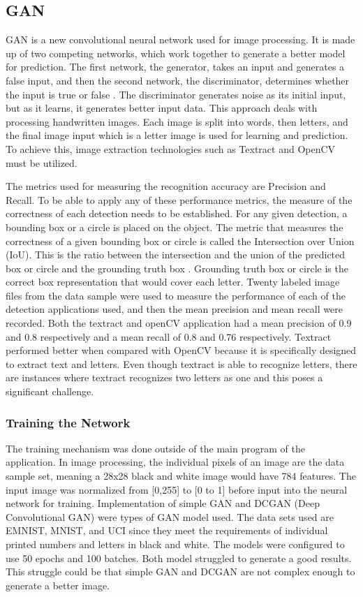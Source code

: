 \documentclass{article}
\begin{document}
\subsection{GAN}
GAN is a new convolutional neural network used for image processing. It is made up of two competing networks, which work together to generate a better model for prediction. The first network, the generator, takes an input and generates a false input, and then the second network, the discriminator, determines whether the input is true or false \cite{Dysgraphia_GAN}. The discriminator generates noise as its initial input, but as it learns, it generates better input data. This approach deals with processing handwritten images. Each image is split into words, then letters, and the final image input which is a letter image is used for learning and prediction. To achieve this, image extraction technologies such as Textract and OpenCV must be utilized. 

The metrics used for measuring the recognition accuracy are Precision and Recall. To be able to apply any of these performance metrics, the measure of the correctness of each detection needs to be established. For any given detection, a bounding box or a circle is placed on the object. The metric that measures the correctness of a given bounding box or circle is called the Intersection over Union (IoU). This is the ratio between the intersection and the union of the predicted box or circle and the grounding truth box \cite{Dysgraphia_IoU_evaluation}. Grounding truth box or circle is the correct box representation that would cover each letter. Twenty labeled image files from the data sample were used to measure the performance of each of the detection applications used, and then the mean precision and mean recall were recorded. Both the textract and openCV application had a mean precision of 0.9 and 0.8 respectively and a mean recall of 0.8 and 0.76 respectively. Textract performed better when compared with OpenCV because it is specifically designed to extract text and letters. Even though textract is able to recognize letters, there are instances where textract recognizes two letters as one and this poses a significant challenge.

\subsubsection{Training the Network}
The training mechanism was done outside of the main program of the application. In image processing, the individual pixels of an image are the data sample set, meaning a 28x28 black and white image would have 784 features. The input image was normalized from [0,255] to [0 to 1] before input into the neural network for training. Implementation of simple GAN and DCGAN (Deep Convolutional GAN) were types of GAN model used. The data sets used are EMNIST, MNIST, and UCI since they meet the requirements of individual printed numbers and letters in black and white. The models were configured to use 50 epochs and 100 batches. Both model struggled to generate a good results. This struggle could be that simple GAN and DCGAN are not complex enough to generate a better image. 
\end{document}
